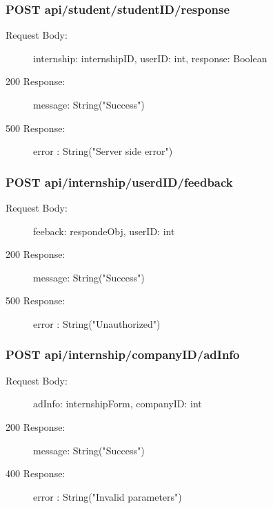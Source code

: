 \documentclass[a4paper,12pt]{article}
\begin{document}
\subsubsection*{POST api/student/{studentID}/response}
\begin{description}
    \item[Request Body:] internship: internshipID, userID: int, response: Boolean
    \item[200 Response:] message: String("Success") 
    \item[500 Response:] error : String("Server side error")
\end{description}

\subsubsection*{POST api/internship/{userdID}/feedback}
\begin{description}
    \item[Request Body:] feeback: respondeObj, userID: int
    \item[200 Response:] message: String("Success") 
    \item[500 Response:] error : String("Unauthorized")
\end{description}

\subsubsection*{POST api/internship/{companyID}/adInfo}
\begin{description}
    \item[Request Body:] adInfo: internshipForm, companyID: int
    \item[200 Response:] message: String("Success") 
    \item[400 Response:] error : String("Invalid parameters")
\end{description}


\newpage
\end{document}

